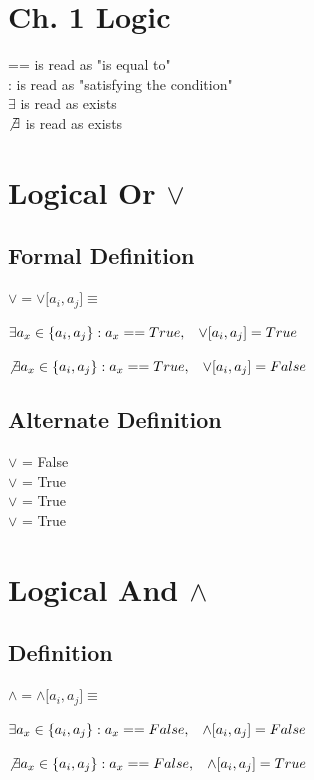 \documentclass[11pt]{article}
\begin{document}
\section*{Ch. 1 Logic}
== is read as "is equal to"\\
: is read as "satisfying the condition"\\
$\exists$ is read as exists\\
$\not \exists$ is read as exists\\

\section{Logical Or $\lor$}
\subsection{Formal Definition}
\begin{center}
$
\lor = \lor \lbrack{a_i,a_j}\rbrack \equiv 
$
\end{center}
\begin{center}
$
\exists a_x \in \{a_i,a_j\} : a_x == True, \hspace{3mm} \lor \lbrack a_i,a_j \rbrack = True
$
\end{center}
\begin{center}
$
\not \exists a_x \in \{a_i,a_j\} : a_x == True, \hspace{3mm} \lor \lbrack a_i,a_j \rbrack = False
$
\end{center}
\subsection{Alternate Definition}
$\lor$ \rbrack  \hspace{.8mm} = False \\
 $\lor$ \rbrack  \hspace{.8mm} = True \\
 $\lor$ \rbrack \hspace{.8mm} = True \\
 $\lor$ \rbrack   \hspace{.8mm} = True

\section{Logical And $\land$}
\subsection{Definition}
\begin{center}
$
\land = \land \lbrack{a_i,a_j}\rbrack \equiv 
$
\end{center}
\begin{center}
$
\exists a_x \in \{a_i,a_j\} : a_x == False, \hspace{3mm} \land \lbrack a_i,a_j \rbrack = False
$
\end{center}
\begin{center}
$
\not \exists a_x \in \{a_i,a_j\} : a_x == False, \hspace{3mm} \land \lbrack a_i,a_j \rbrack = True
$
\end{center}
\end{document}
